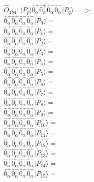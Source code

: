 \documentclass[14pt]{article}
\begin{document}
    $\hat{O}_{184}:  \langle{P_p}\vert \hat{0}_{\alpha}^{+}\hat{0}_{\alpha}^{+}\hat{0}_{\alpha}^{-}\hat{0}_{\alpha}^{-} \vert{P_q}\rangle => $ \\ 
    $ \hat{0}_{\alpha}^{+}\hat{0}_{\alpha}^{+}\hat{0}_{\alpha}^{-}\hat{0}_{\alpha}^{-} \vert{P_{0}}\rangle =  $ \\ 
    $ \hat{0}_{\alpha}^{+}\hat{0}_{\alpha}^{+}\hat{0}_{\alpha}^{-}\hat{0}_{\alpha}^{-} \vert{P_{1}}\rangle =  $ \\ 
    $ \hat{0}_{\alpha}^{+}\hat{0}_{\alpha}^{+}\hat{0}_{\alpha}^{-}\hat{0}_{\alpha}^{-} \vert{P_{2}}\rangle =  $ \\ 
    $ \hat{0}_{\alpha}^{+}\hat{0}_{\alpha}^{+}\hat{0}_{\alpha}^{-}\hat{0}_{\alpha}^{-} \vert{P_{3}}\rangle =  $ \\ 
    $ \hat{0}_{\alpha}^{+}\hat{0}_{\alpha}^{+}\hat{0}_{\alpha}^{-}\hat{0}_{\alpha}^{-} \vert{P_{4}}\rangle =  $ \\ 
    $ \hat{0}_{\alpha}^{+}\hat{0}_{\alpha}^{+}\hat{0}_{\alpha}^{-}\hat{0}_{\alpha}^{-} \vert{P_{5}}\rangle =  $ \\ 
    $ \hat{0}_{\alpha}^{+}\hat{0}_{\alpha}^{+}\hat{0}_{\alpha}^{-}\hat{0}_{\alpha}^{-} \vert{P_{6}}\rangle =  $ \\ 
    $ \hat{0}_{\alpha}^{+}\hat{0}_{\alpha}^{+}\hat{0}_{\alpha}^{-}\hat{0}_{\alpha}^{-} \vert{P_{7}}\rangle =  $ \\ 
    $ \hat{0}_{\alpha}^{+}\hat{0}_{\alpha}^{+}\hat{0}_{\alpha}^{-}\hat{0}_{\alpha}^{-} \vert{P_{8}}\rangle =  $ \\ 
    $ \hat{0}_{\alpha}^{+}\hat{0}_{\alpha}^{+}\hat{0}_{\alpha}^{-}\hat{0}_{\alpha}^{-} \vert{P_{9}}\rangle =  $ \\ 
    $ \hat{0}_{\alpha}^{+}\hat{0}_{\alpha}^{+}\hat{0}_{\alpha}^{-}\hat{0}_{\alpha}^{-} \vert{P_{10}}\rangle =  $ \\ 
    $ \hat{0}_{\alpha}^{+}\hat{0}_{\alpha}^{+}\hat{0}_{\alpha}^{-}\hat{0}_{\alpha}^{-} \vert{P_{11}}\rangle =  $ \\ 
    $ \hat{0}_{\alpha}^{+}\hat{0}_{\alpha}^{+}\hat{0}_{\alpha}^{-}\hat{0}_{\alpha}^{-} \vert{P_{12}}\rangle =  $ \\ 
    $ \hat{0}_{\alpha}^{+}\hat{0}_{\alpha}^{+}\hat{0}_{\alpha}^{-}\hat{0}_{\alpha}^{-} \vert{P_{13}}\rangle =  $ \\ 
    $ \hat{0}_{\alpha}^{+}\hat{0}_{\alpha}^{+}\hat{0}_{\alpha}^{-}\hat{0}_{\alpha}^{-} \vert{P_{14}}\rangle =  $ \\ 
    $ \hat{0}_{\alpha}^{+}\hat{0}_{\alpha}^{+}\hat{0}_{\alpha}^{-}\hat{0}_{\alpha}^{-} \vert{P_{15}}\rangle =  $ \\ 
    
\end{document}

